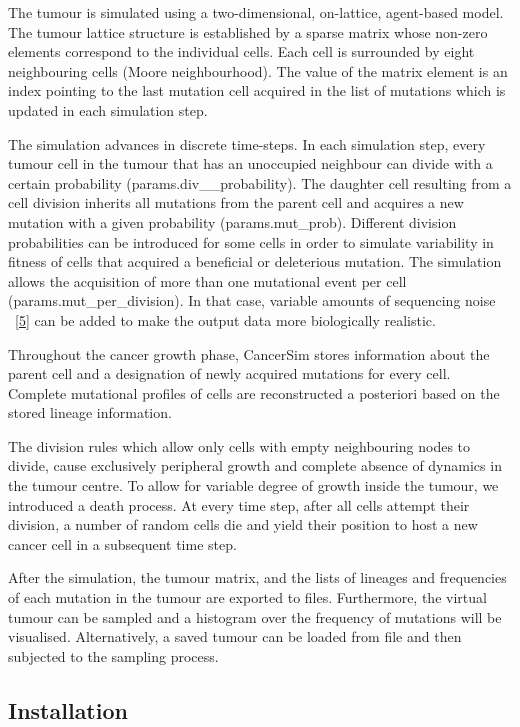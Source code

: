 \documentclass[]{article}
\begin{document}
The tumour is simulated using a two-dimensional, on-lattice, agent-based
model. The tumour lattice structure is established by a sparse matrix
whose non-zero elements correspond to the individual cells. Each cell is
surrounded by eight neighbouring cells (Moore neighbourhood). The value
of the matrix element is an index pointing to the last mutation cell
acquired in the list of mutations which is updated in each simulation
step.

The simulation advances in discrete time-steps. In each simulation step,
every tumour cell in the tumour that has an unoccupied neighbour can
divide with a certain probability (params.div\_\_probability). The
daughter cell resulting from a cell division inherits all mutations from
the parent cell and acquires a new mutation with a given probability
(params.mut\_prob). Different division probabilities can be introduced
for some cells in order to simulate variability in fitness of cells that
acquired a beneficial or deleterious mutation. The simulation allows the
acquisition of more than one mutational event per cell
(params.mut\_per\_division). In that case, variable amounts of
sequencing noise ~{[}\protect\hyperlink{ref-williams:NG:2016}{5}{]} can
be added to make the output data more biologically realistic.

Throughout the cancer growth phase, CancerSim stores information about
the parent cell and a designation of newly acquired mutations for every
cell. Complete mutational profiles of cells are reconstructed a
posteriori based on the stored lineage information.

The division rules which allow only cells with empty neighbouring nodes
to divide, cause exclusively peripheral growth and complete absence of
dynamics in the tumour centre. To allow for variable degree of growth
inside the tumour, we introduced a death process. At every time step,
after all cells attempt their division, a number of random cells die and
yield their position to host a new cancer cell in a subsequent time
step.

After the simulation, the tumour matrix, and the lists of lineages and
frequencies of each mutation in the tumour are exported to files.
Furthermore, the virtual tumour can be sampled and a histogram over the
frequency of mutations will be visualised. Alternatively, a saved tumour
can be loaded from file and then subjected to the sampling process.

\hypertarget{installation}{%
\subsection{Installation}\label{installation}}
\end{document}
